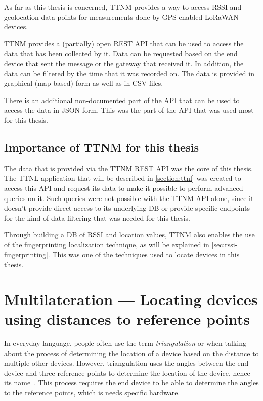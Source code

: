 As far as this thesis is concerned, \acl{TTNM} provides a way to access \ac{RSSI} and geolocation data points for measurements done by \ac{GPS}-enabled \ac{LoRaWAN} devices.

\ac{TTNM} provides a (partially) open \ac{REST} \ac{API} that can be used to access the data that has been collected by it.
Data can be requested based on the end device that sent the message or the gateway that received it.
In addition, the data can be filtered by the time that it was recorded on.
The data is provided in graphical (map-based) form as well as in \ac{CSV} files.

There is an additional non-documented part of the \ac{API} that can be used to access the data in \ac{JSON} form.
This was the part of the \ac{API} that was used most for this thesis.

\subsection{Importance of \acl{TTNM} for this thesis}\label{sec:ttn-mapper-importance}

The data that is provided via the \ac{TTNM} \ac{REST} \ac{API} was the core of this thesis.
The \ac{TTNL} application that will be described in \cref{section:ttnl} was created to access this \ac{API} and request its data to make it possible to perform advanced queries on it.
Such queries were not possible with the \ac{TTNM} \ac{API} alone, since it doesn't provide direct access to its underlying \ac{DB} or provide specific endpoints for the kind of data filtering that was needed for this thesis.

Through building a \ac{DB} of \ac{RSSI} and location values, \ac{TTNM} also enables the use of the fingerprinting localization technique, as will be explained in \cref{sec:rssi-fingerprinting}.
This was one of the techniques used to locate devices in this thesis.

\section{Multilateration — Locating devices using distances to reference points}\label{sec:multilateration-basics}

In everyday language, people often use the term \emph{triangulation} or when talking about the process of determining the location of a device based on the distance to multiple other devices.
However, triangulation uses the angles between the end device and three reference points to determine the location of the device, hence its name~\cite{yaro_multiangulation_2017}.
This process requires the end device to be able to determine the angles to the reference points, which is needs specific hardware.


